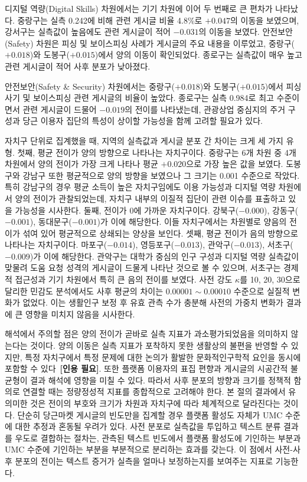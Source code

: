 디지털 역량(Digital Skills) 차원에서는 기기 차원에 이어 두 번째로 큰 편차가 나타났다. 중랑구는 실측 0.242에 비해 관련 게시글 비율 4.8\%로 $+0.047$의 이동을 보였으며, 강서구는 실측값이 높음에도 관련 게시글이 적어 $-0.031$의 이동을 보였다. 안전\textperiodcentered{}보안(Safety) 차원은 피싱 및 보이스피싱 사례가 게시글의 주요 내용을 이루었고, 중랑구($+0.018$)와 도봉구($+0.015$)에서 양의 이동이 확인되었다. 종로구는 실측값이 매우 높고 관련 게시글이 적어 사후 분포가 낮아졌다.

안전\textperiodcentered{}보안(Safety \& Security) 차원에서는 중랑구($+0.018$)와 도봉구($+0.015$)에서 피싱 사기 및 보이스피싱 관련 게시글의 비율이 높았다. 종로구는 실측 0.984로 최고 수준이면서 관련 게시글이 드물어 $-0.019$의 전이를 나타냈는데, 관광\textperiodcentered{}상업 중심지의 주거 구성과 당근 이용자 집단의 특성이 상이할 가능성을 함께 고려할 필요가 있다.

자치구 단위로 집계했을 때, 지역의 실측값과 게시글 분포 간 차이는 크게 세 가지 유형. 첫째, 평균 전이가 양의 방향으로 나타나는 자치구이다. 중랑구는 6개 차원 중 4개 차원에서 양의 전이가 가장 크게 나타나 평균 $+0.020$으로 가장 높은 값을 보였다. 도봉구와 강남구 또한 평균적으로 양의 방향을 보였으나 그 크기는 0.001 수준으로 작았다. 특히 강남구의 경우 평균 소득이 높은 자치구임에도 이용 가능성과 디지털 역량 차원에서 양의 전이가 관찰되었는데, 자치구 내부의 이질적 집단이 관련 이슈를 표출하고 있을 가능성을 시사한다. 둘째, 전이가 0에 가까운 자치구이다. 강북구($-0.000$), 강동구($-0.001$), 동대문구($-0.001$)가 이에 해당한다. 이들 자치구에서는 차원별로 양\textperiodcentered{}음의 전이가 섞여 있어 평균적으로 상쇄되는 양상을 보인다. 셋째, 평균 전이가 음의 방향으로 나타나는 자치구이다. 마포구($-0.014$), 영등포구($-0.013$), 관악구($-0.013$), 서초구($-0.009$)가 이에 해당한다. 관악구는 대학가 중심의 인구 구성과 디지털 역량 실측값이 맞물려 도움 요청 성격의 게시글이 드물게 나타난 것으로 볼 수 있으며, 서초구는 경제적 접근성과 기기 차원에서 특히 큰 음의 전이를 보였다. 사전 강도 $\kappa$를 10, 20, 30으로 달리한 민감도 분석에서도 사후 평균의 차이는 $0.00001\sim0.00010$ 수준으로 실질적 변화가 없었다. 이는 생활인구 보정 후 유효 관측 수가 충분해 사전의 가중치 변화가 결과에 큰 영향을 미치지 않음을 시사한다.

해석에서 주의할 점은 양의 전이가 곧바로 실측 지표가 과소평가되었음을 의미하지 않는다는 것이다. 양의 이동은 실측 지표가 포착하지 못한 생활상의 불편을 반영할 수 있지만, 특정 자치구에서 특정 문제에 대한 논의가 활발한 문화적\textperiodcentered{}인구학적 요인을 동시에 포함할 수 있다~\textbf{[인용 필요]}. 또한 플랫폼 이용자의 표집 편향과 게시글의 시공간적 불균형이 결과 해석에 영향을 미칠 수 있다. 따라서 사후 분포의 방향과 크기를 정책적 함의로 연결할 때는 정량\textperiodcentered{}정성적 지표를 종합적으로 고려해야 한다. 본 절의 결과에서 유의미한 것은 전이의 부호와 크기가 차원과 자치구에 따라 체계적으로 달라진다는 것이다. 단순히 당근마켓 게시글의 빈도만을 집계할 경우 플랫폼 활성도 자체가 UMC 수준에 대한 추정과 혼동될 우려가 있다. 사전 분포로 실측값을 투입하고 텍스트 분류 결과를 우도로 결합하는 절차는, 관측된 텍스트 빈도에서 플랫폼 활성도에 기인하는 부분과 UMC 수준에 기인하는 부분을 부분적으로 분리하는 효과를 갖는다. 이 점에서 사전-사후 분포의 전이는 텍스트 증거가 실측을 얼마나 보정하는지를 보여주는 지표로 기능한다.

